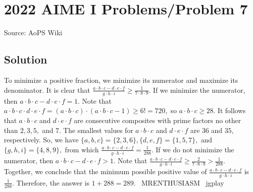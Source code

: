 \documentclass[12pt]{article}
\begin{document}
\section*{{2022 AIME I Problems/Problem 7}}
Source: AoPS Wiki

\subsection*{Solution}
To minimize a positive fraction, we minimize its numerator and maximize its denominator. It is clear that $\frac{a \cdot b \cdot c - d \cdot e \cdot f}{g \cdot h \cdot i} \geq \frac{1}{7\cdot8\cdot9}.$ If we minimize the numerator, then $a \cdot b \cdot c - d \cdot e \cdot f = 1.$ Note that $a \cdot b \cdot c \cdot d \cdot e \cdot f = (a \cdot b \cdot c) \cdot (a \cdot b \cdot c - 1) \geq 6! = 720,$ so $a \cdot b \cdot c \geq 28.$ It follows that $a \cdot b \cdot c$ and $d \cdot e \cdot f$ are consecutive composites with prime factors no other than $2,3,5,$ and $7.$ The smallest values for $a \cdot b \cdot c$ and $d \cdot e \cdot f$ are $36$ and $35,$ respectively. So, we have $\{a,b,c\} = \{2,3,6\}, \{d,e,f\} = \{1,5,7\},$ and $\{g,h,i\} = \{4,8,9\},$ from which $\frac{a \cdot b \cdot c - d \cdot e \cdot f}{g \cdot h \cdot i} = \frac{1}{288}.$ If we do not minimize the numerator, then $a \cdot b \cdot c - d \cdot e \cdot f > 1.$ Note that $\frac{a \cdot b \cdot c - d \cdot e \cdot f}{g \cdot h \cdot i} \geq \frac{2}{7\cdot8\cdot9} > \frac{1}{288}.$ Together, we conclude that the minimum possible positive value of $\frac{a \cdot b \cdot c - d \cdot e \cdot f}{g \cdot h \cdot i}$ is $\frac{1}{288}.$ Therefore, the answer is $1+288=\boxed{289}.$ ~MRENTHUSIASM ~jgplay
\end{document}

